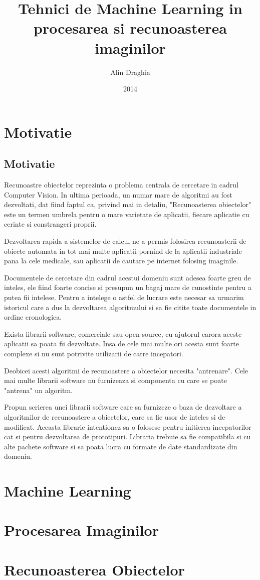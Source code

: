 \documentclass[12pt,a4paper]{book}
\title{Tehnici de Machine Learning in procesarea si recunoasterea imaginilor}
\author{Alin Draghia}
\date{2014}
\begin{document}
\maketitle

\tableofcontents


\chapter{Motivatie}

\section{Motivatie}


Recunoastre obiectelor reprezinta o problema centrala de cercetare in cadrul Computer Vision.
In ultima perioada, un numar mare de algoritmi au fost dezvoltati, dat fiind faptul ca, privind mai in detaliu, 
"Recunoasterea obiectelor" este un termen umbrela pentru o mare varietate de aplicatii, fiecare aplicatie
cu cerinte si constrangeri proprii.


Dezvoltarea rapida a sistemelor de calcul ne-a permis folosirea recunoasterii de obiecte automata in tot mai multe aplicatii pornind de la aplicatii industriale pana la cele medicale, sau aplicatii de cautare pe internet folosing imaginile.


Documentele de cercetare din cadrul acestui domeniu sunt adesea foarte greu de inteles, ele fiind foarte concise si 
presupun un bagaj mare de cunostinte pentru a putea fii intelese. Pentru a intelege o astfel de lucrare este necesar sa urmarim
istoricul care a dus la dezvoltarea algoritmului si sa fie citite toate documentele in ordine cronologica.


Exista librarii software, comerciale sau open-source, cu ajutorul carora aceste aplicatii sa poata fii dezvoltate. 
Insa de cele mai multe ori acesta sunt foarte complexe si nu sunt potrivite utilizarii de catre incepatori.


Deobicei acesti algoritmi de recunoastere a obiectelor necesita "antrenare". 
Cele mai multe librarii software nu furnizeaza si componenta cu care se poate "antrena" un algoritm.


Propun scrierea unei librarii software care sa furnizeze o baza de dezvoltare a algoritmilor de recunoastere a obiectelor,
care sa fie usor de inteles si de modificat. 
Aceasta librarie intentionez sa o folosesc pentru initierea incepatorilor cat si pentru dezvoltarea de prototipuri.
Libraria trebuie sa fie compatibila si cu alte pachete software si sa poata lucra cu formate de date standardizate din domeniu.



\chapter{Machine Learning}

\chapter{Procesarea Imaginilor}

\chapter{Recunoasterea Obiectelor}
\end{document}
